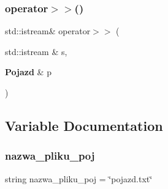 \subsubsection{operator$>$$>$()}
{\footnotesize\ttfamily std\+::istream\& operator$>$$>$ (\begin{DoxyParamCaption}\item[{std\+::istream \&}]{s,  }\item[{\textbf{ Pojazd} \&}]{p }\end{DoxyParamCaption})}



\subsection{Variable Documentation}
\mbox{\label{_pojazd_8cpp_a2c1e9002ea68196e590270f9cbc05302}} 
\subsubsection{nazwa\+\_\+pliku\+\_\+poj}
{\footnotesize\ttfamily string nazwa\+\_\+pliku\+\_\+poj = \char`\"{}pojazd.\+txt\char`\"{}}


